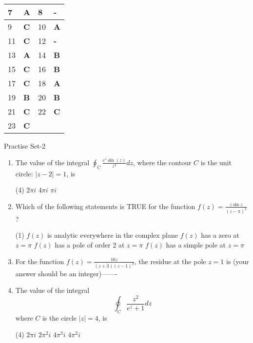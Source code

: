 \begin{note}
\begin{table}[H]
\begin{tabular}{|p{1.5cm}|p{1.5cm}||p{1.5cm}|p{1.5cm}|}
		7&\textbf{A}&8&\textbf{-}\\\hline
		9&\textbf{C}&10&\textbf{A}\\\hline
		11&\textbf{C} &12&\textbf{-}\\\hline
		13&\textbf{A}&14&\textbf{B}\\\hline
		15&\textbf{C}&16&\textbf{B}\\\hline
		17&\textbf{C} &18&\textbf{A}\\\hline
		19&\textbf{B}&20&\textbf{B}\\\hline
		21&\textbf{C}&22&\textbf{C}\\\hline
		23&\textbf{C}& &\\\hline
		
	\end{tabular}
\end{table}
\newpage
\begin{abox}
	Practise Set-2
\end{abox}
\begin{enumerate}[label=\color{ocre}\textbf{\arabic*.}]
	\item  The value of the integral $\oint_{C} \frac{e^{z} \sin (z)}{z^{2}} d z$, where the contour $C$ is the unit circle: $|z-2|=1$, is
	{}
	\begin{tasks}(4)
		\task[\textbf{A.}] $2 \pi i$
		\task[\textbf{B.}] $4 \pi i$
		\task[\textbf{C.}] $\pi i$
	\end{tasks}
	\item Which of the following statements is TRUE for the function $f(z)=\frac{z \sin z}{(z-\pi)^{2}}$ ?
	{}
	\begin{tasks}(1)
		\task[\textbf{A.}] $f(z)$ is analytic everywhere in the complex plane
		\task[\textbf{B.}] $f(z)$ has a zero at $z=\pi$
		\task[\textbf{C.}] $f(z)$ has a pole of order 2 at $z=\pi$
		\task[\textbf{D.}] $f(z)$ has a simple pole at $z=\pi$
	\end{tasks}
	\item For the function $f(z)=\frac{16 z}{(z+3)(z-1)^{2}}$, the residue at the pole $z=1$ is (your answer should be an integer)-------
	{}
	\item The value of the integral
	$$
	\oint_{C} \frac{z^{2}}{e^{z}+1} d z
	$$
	where $C$ is the circle $|z|=4$, is
	{}
	\begin{tasks}(4)
		\task[\textbf{A.}] $2 \pi i$
		\task[\textbf{B.}] $2 \pi^{2} i$
		\task[\textbf{C.}]  $4 \pi^{3} i$
		\task[\textbf{D.}] $4 \pi^{2} i$
	\end{tasks}

\end{enumerate}
\end{note}
